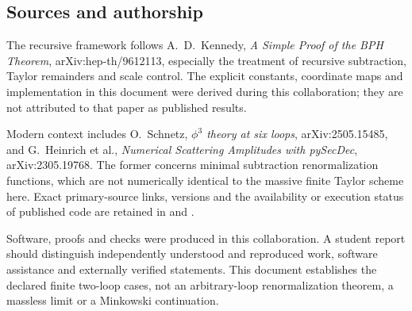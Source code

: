 \subsection{Sources and authorship}
The recursive framework follows A.~D.~Kennedy, \emph{A Simple Proof of the
BPH Theorem}, arXiv:hep-th/9612113, especially the treatment of recursive
subtraction, Taylor remainders and scale control. The explicit constants,
coordinate maps and implementation in this document were derived during
this collaboration; they are not attributed to that paper as published
results.

Modern context includes O.~Schnetz, \emph{$\phi^3$ theory at six loops},
arXiv:2505.15485, and G.~Heinrich et al., \emph{Numerical Scattering
Amplitudes with pySecDec}, arXiv:2305.19768. The former concerns minimal
subtraction renormalization functions, which are not numerically identical
to the massive finite Taylor scheme here. Exact primary-source links,
versions and the availability or execution status of published code are
retained in  and
.

Software, proofs and checks were produced in this collaboration. A student
report should distinguish independently understood and reproduced work,
software assistance and externally verified statements. This document
establishes the declared finite two-loop cases, not an arbitrary-loop
renormalization theorem, a massless limit or a Minkowski continuation.

